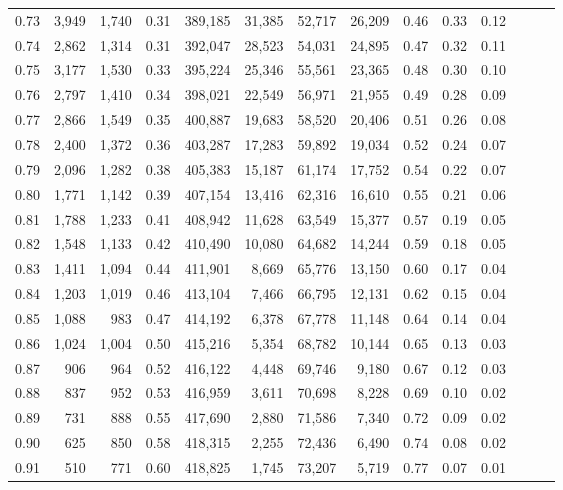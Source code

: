 \begin{tabular}{rrrrrrrrrrrrrr}
0.73 &  3,949 &  1,740 &  0.31 &  389,185 &   31,385 &  52,717 &  26,209 &  0.46 &  0.33 &      0.12 \\
0.74 &  2,862 &  1,314 &  0.31 &  392,047 &   28,523 &  54,031 &  24,895 &  0.47 &  0.32 &      0.11 \\
0.75 &  3,177 &  1,530 &  0.33 &  395,224 &   25,346 &  55,561 &  23,365 &  0.48 &  0.30 &      0.10 \\
0.76 &  2,797 &  1,410 &  0.34 &  398,021 &   22,549 &  56,971 &  21,955 &  0.49 &  0.28 &      0.09 \\
0.77 &  2,866 &  1,549 &  0.35 &  400,887 &   19,683 &  58,520 &  20,406 &  0.51 &  0.26 &      0.08 \\
0.78 &  2,400 &  1,372 &  0.36 &  403,287 &   17,283 &  59,892 &  19,034 &  0.52 &  0.24 &      0.07 \\
0.79 &  2,096 &  1,282 &  0.38 &  405,383 &   15,187 &  61,174 &  17,752 &  0.54 &  0.22 &      0.07 \\
0.80 &  1,771 &  1,142 &  0.39 &  407,154 &   13,416 &  62,316 &  16,610 &  0.55 &  0.21 &      0.06 \\
0.81 &  1,788 &  1,233 &  0.41 &  408,942 &   11,628 &  63,549 &  15,377 &  0.57 &  0.19 &      0.05 \\
0.82 &  1,548 &  1,133 &  0.42 &  410,490 &   10,080 &  64,682 &  14,244 &  0.59 &  0.18 &      0.05 \\
0.83 &  1,411 &  1,094 &  0.44 &  411,901 &    8,669 &  65,776 &  13,150 &  0.60 &  0.17 &      0.04 \\
0.84 &  1,203 &  1,019 &  0.46 &  413,104 &    7,466 &  66,795 &  12,131 &  0.62 &  0.15 &      0.04 \\
0.85 &  1,088 &    983 &  0.47 &  414,192 &    6,378 &  67,778 &  11,148 &  0.64 &  0.14 &      0.04 \\
0.86 &  1,024 &  1,004 &  0.50 &  415,216 &    5,354 &  68,782 &  10,144 &  0.65 &  0.13 &      0.03 \\
0.87 &    906 &    964 &  0.52 &  416,122 &    4,448 &  69,746 &   9,180 &  0.67 &  0.12 &      0.03 \\
0.88 &    837 &    952 &  0.53 &  416,959 &    3,611 &  70,698 &   8,228 &  0.69 &  0.10 &      0.02 \\
0.89 &    731 &    888 &  0.55 &  417,690 &    2,880 &  71,586 &   7,340 &  0.72 &  0.09 &      0.02 \\
0.90 &    625 &    850 &  0.58 &  418,315 &    2,255 &  72,436 &   6,490 &  0.74 &  0.08 &      0.02 \\
0.91 &    510 &    771 &  0.60 &  418,825 &    1,745 &  73,207 &   5,719 &  0.77 &  0.07 &      0.01 \\

\end{tabular}
